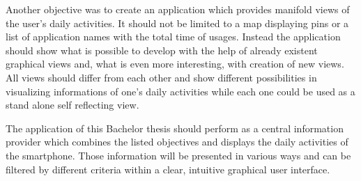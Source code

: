 Another  objective was to create an application which provides manifold views of the user's daily activities. It should not be limited to a map displaying pins or a list of application names with the total time of usages. Instead the application should show what is possible to develop with the help of already existent graphical views and, what is even more interesting, with creation of new views. All views should differ from each other and show different possibilities in visualizing informations of one's daily activities while each one could be used as a stand alone self reflecting view.

The application of this Bachelor thesis should perform as a central information provider which combines the listed objectives and displays the daily activities of the smartphone. Those information will be presented in various ways and can be filtered by different criteria within a clear, intuitive graphical user interface.